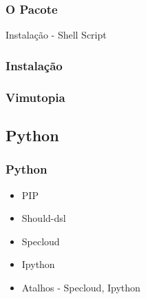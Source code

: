 \documentclass[]{beamer}
\begin{document}
\begin{frame}
    \frametitle{O Pacote}
        Instalação - Shell Script
\end{frame}

\begin{frame}
    \frametitle{Instalação}
    \begin{center}
    \end{center}
\end{frame}

\begin{frame}
    \frametitle{Vimutopia}
    \begin{center}
    \end{center}
\end{frame}
\subsection{Python}

\begin{frame}
    \frametitle{Python}
    \begin{itemize}
        \item<1-> PIP
        \item<2-> Should-dsl
        \item<3-> Specloud
        \item<4-> Ipython
        \item<5-> Atalhos - Specloud, Ipython
    \end{itemize}
\end{frame}
\end{document}
